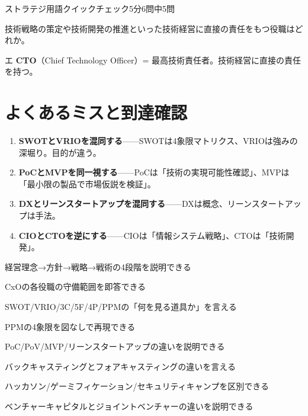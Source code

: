 \begin{timeattack}{ストラテジ用語クイックチェック}{5分}{6問中5問}
\begin{itpmon}{%
技術戦略の策定や技術開発の推進といった技術経営に直接の責任をもつ役職はどれか。}
\end{itpmon}
\begin{kaisetsu}{エ}
\textbf{CTO}（Chief Technology Officer）= 最高技術責任者。技術経営に直接の責任を持つ。
\end{kaisetsu}

\end{timeattack}

\section{よくあるミスと到達確認}

\begin{yokumiss}[この章でよくあるミス]
\begin{enumerate}[leftmargin=1.6em, itemsep=5pt]
  \item \textbf{SWOTとVRIOを混同する}——SWOTは4象限マトリクス、VRIOは強みの深堀り。目的が違う。
  \item \textbf{PoCとMVPを同一視する}——PoCは「技術の実現可能性確認」、MVPは「最小限の製品で市場仮説を検証」。
  \item \textbf{DXとリーンスタートアップを混同する}——DXは概念、リーンスタートアップは手法。
  \item \textbf{CIOとCTOを逆にする}——CIOは「情報システム戦略」、CTOは「技術開発」。
\end{enumerate}
\end{yokumiss}

\begin{tatsaku}
  \item 経営理念→方針→戦略→戦術の4段階を説明できる
  \item CxOの各役職の守備範囲を即答できる
  \item SWOT/VRIO/3C/5F/4P/PPMの「何を見る道具か」を言える
  \item PPMの4象限を図なしで再現できる
  \item PoC/PoV/MVP/リーンスタートアップの違いを説明できる
  \item バックキャスティングとフォアキャスティングの違いを言える
  \item ハッカソン/ゲーミフィケーション/セキュリティキャンプを区別できる
  \item ベンチャーキャピタルとジョイントベンチャーの違いを説明できる
\end{tatsaku}

